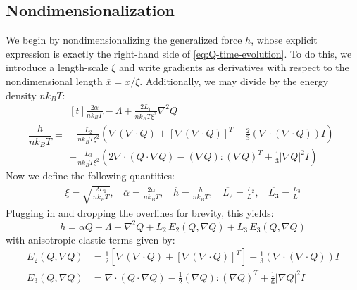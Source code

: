 \documentclass[reqno]{article}
\begin{document}
  \subsection{Nondimensionalization}
  We begin by nondimensionalizing the generalized force $h$, whose explicit
  expression is exactly the right-hand side of \eqref{eq:Q-time-evolution}.
  To do this, we introduce a length-scale $\xi$ and write gradients as
  derivatives with respect to the nondimensional length $\overline{x} = x /
  \xi$.
  Additionally, we may divide by the energy density $n k_B T$:
  \begin{equation}
    \frac{h}{n k_B T}
    =
    \begin{multlined}[t]
      \frac{2 \alpha}{n k_B T}
      - \Lambda
      + \frac{2 L_1}{n k_B T \xi^2} \nabla^2 Q  \\
      + \frac{L_2}{n k_B T \xi^2} \left(
        \nabla \left( \nabla \cdot Q \right)
        + \left[ \nabla \left( \nabla \cdot Q \right) \right]^T
        - \tfrac23 \left( \nabla \cdot \left( \nabla \cdot Q \right) \right) I
      \right) \\
      + \frac{L_3}{n k_B T \xi^2} \left(
        2 \nabla \cdot \left( Q \cdot \nabla Q \right)
        - \left( \nabla Q \right) : \left( \nabla Q \right)^T
        + \tfrac13 \left| \nabla Q \right|^2 I
      \right)
    \end{multlined}
  \end{equation}
  Now we define the following quantities:
  \begin{equation}
    \begin{split}
      \xi = \sqrt{\frac{2 L_1}{n k_B T}}, \:\:\:\:
      \overline{\alpha} = \frac{2 \alpha}{n k_B T}, \:\:\:\:
      \overline{h} = \frac{h}{n k_B T}, \:\:\:\:
      \overline{L_2} = \frac{L_2}{L_1}, \:\:\:\:
      \overline{L_3} = \frac{L_3}{L_1}
    \end{split}
  \end{equation}
  Plugging in and dropping the overlines for brevity, this yields:
  \begin{equation}
    h
    =
    \alpha Q
    - \Lambda
    + \nabla^2 Q 
    + L_2 \, E_2 (Q, \nabla Q) 
    + L_3 \, E_3 (Q, \nabla Q)
  \end{equation}
  with anisotropic elastic terms given by:
  \begin{align}
    E_2 (Q, \nabla Q)
    &=
    \tfrac12 \left[
    \nabla \left( \nabla \cdot Q \right)
    + \left[ \nabla \left( \nabla \cdot Q \right) \right]^T
    \right]
    - \tfrac13 \left( \nabla \cdot \left( \nabla \cdot Q \right) \right) I \\
    E_3(Q, \nabla Q)
    &=
    \nabla \cdot \left( Q \cdot \nabla Q \right)
    - \tfrac12 \left( \nabla Q \right) :  \left( \nabla Q \right)^T
    + \tfrac16 \left| \nabla Q \right|^2 I
  \end{align}
\end{document}

